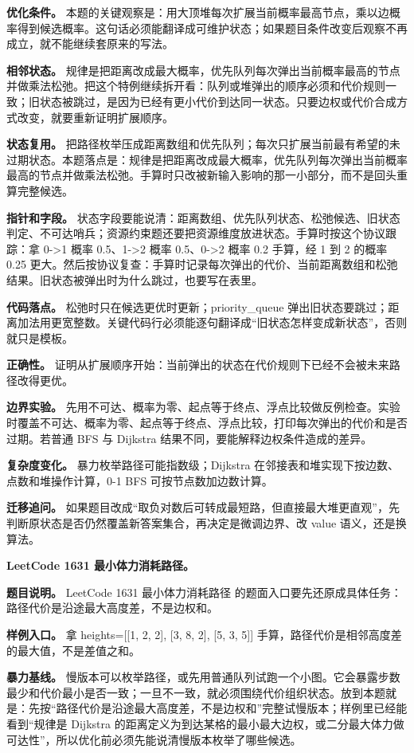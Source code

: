 \textbf{优化条件。} 本题的关键观察是：用大顶堆每次扩展当前概率最高节点，乘以边概率得到候选概率。这句话必须能翻译成可维护状态；如果题目条件改变后观察不再成立，就不能继续套原来的写法。

\textbf{相邻状态。} 规律是把距离改成最大概率，优先队列每次弹出当前概率最高的节点并做乘法松弛。把这个特例继续拆开看：队列或堆弹出的顺序必须和代价规则一致；旧状态被跳过，是因为已经有更小代价到达同一状态。只要边权或代价合成方式改变，就要重新证明扩展顺序。

\textbf{状态复用。} 把路径枚举压成距离数组和优先队列；每次只扩展当前最有希望的未过期状态。本题落点是：规律是把距离改成最大概率，优先队列每次弹出当前概率最高的节点并做乘法松弛。手算时只改被新输入影响的那一小部分，而不是回头重算完整候选。

\textbf{指针和字段。} 状态字段要能说清：距离数组、优先队列状态、松弛候选、旧状态判定、不可达哨兵；资源约束题还要把资源维度放进状态。手算时按这个协议跟踪：拿 0->1 概率 0.5、1->2 概率 0.5、0->2 概率 0.2 手算，经 1 到 2 的概率 0.25 更大。然后按协议复查：手算时记录每次弹出的代价、当前距离数组和松弛结果。旧状态被弹出时为什么跳过，也要写在表里。

\textbf{代码落点。} 松弛时只在候选更优时更新；priority\_queue 弹出旧状态要跳过；距离加法用更宽整数。关键代码行必须能逐句翻译成“旧状态怎样变成新状态”，否则就只是模板。

\textbf{正确性。} 证明从扩展顺序开始：当前弹出的状态在代价规则下已经不会被未来路径改得更优。

\textbf{边界实验。} 先用不可达、概率为零、起点等于终点、浮点比较做反例检查。实验时覆盖不可达、概率为零、起点等于终点、浮点比较，打印每次弹出的代价和是否过期。若普通 BFS 与 Dijkstra 结果不同，要能解释边权条件造成的差异。

\textbf{复杂度变化。} 暴力枚举路径可能指数级；Dijkstra 在邻接表和堆实现下按边数、点数和堆操作计算，0-1 BFS 可按节点数加边数计算。

\textbf{迁移追问。} 如果题目改成“取负对数后可转成最短路，但直接最大堆更直观”，先判断原状态是否仍然覆盖新答案集合，再决定是微调边界、改 value 语义，还是换算法。

\noindent\textbf{LeetCode 1631 最小体力消耗路径。}

\textbf{题目说明。} LeetCode 1631 最小体力消耗路径 的题面入口要先还原成具体任务：路径代价是沿途最大高度差，不是边权和。

\textbf{样例入口。} 拿 heights=[[1, 2, 2], [3, 8, 2], [5, 3, 5]] 手算，路径代价是相邻高度差的最大值，不是差值之和。

\textbf{暴力基线。} 慢版本可以枚举路径，或先用普通队列试跑一个小图。它会暴露步数最少和代价最小是否一致；一旦不一致，就必须围绕代价组织状态。放到本题就是：先按“路径代价是沿途最大高度差，不是边权和”完整试慢版本；样例里已经能看到“规律是 Dijkstra 的距离定义为到达某格的最小最大边权，或二分最大体力做可达性”，所以优化前必须先能说清慢版本枚举了哪些候选。

